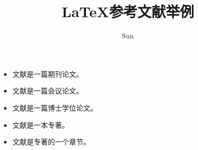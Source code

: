 \documentclass{article}
\title{{\LaTeX}参考文献举例}
\author{Sun}
\begin{document}
   \maketitle
   \begin{itemize}
        \item 文献\cite{wittig_high_2015}是一篇期刊论文。
        \item 文献\cite{massari_differential_2018}是一篇会议论文。
        \item 文献\cite{johannes_grote_high-order_2009}是一篇博士学位论文。
        \item 文献\cite{companion}是一本专著。
        \item 文献\cite{berz_modern_1999}是专著的一个章节。
   \end{itemize}
   


\end{document}
